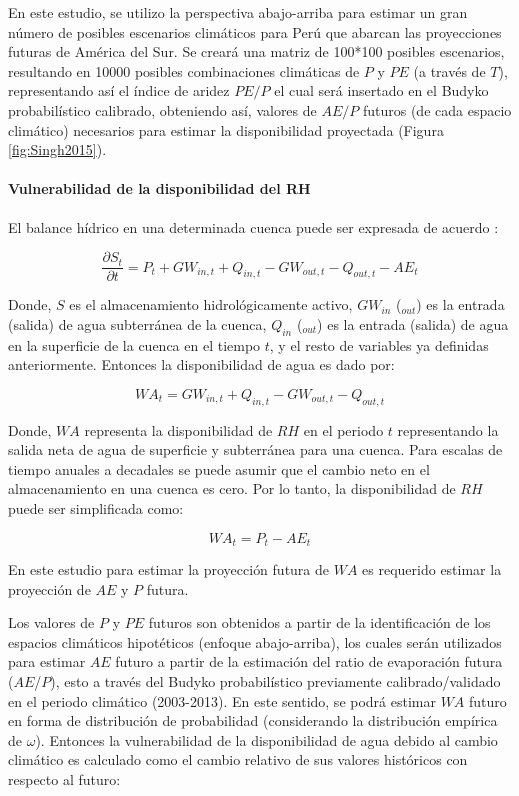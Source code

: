 \documentclass[12pt]{article}
\begin{document}
En este estudio, se utilizo la perspectiva abajo-arriba para estimar un gran número de posibles escenarios climáticos para Perú que abarcan las proyecciones futuras de América del Sur. Se creará una matriz de 100*100 posibles escenarios, resultando en 10000 posibles combinaciones climáticas de $P$ y $PE$ (a través de $T$), representando así el índice de aridez $PE/P$ el cual será insertado en el Budyko probabilístico calibrado, obteniendo así, valores de $AE/P$ futuros (de cada espacio climático) necesarios para estimar la disponibilidad proyectada (Figura \ref{fig:Singh2015}).

\paragraph{Vulnerabilidad de la disponibilidad del RH}\mbox{}

El balance hídrico en una determinada cuenca puede ser expresada de acuerdo \citep{Singh2015}:

\begin{equation}
\frac{\partial S_{t}}{\partial t} = P_{t} + GW_{in,t} + Q_{in,t} - GW_{out,t} - Q_{out,t} - AE_{t} 
\end{equation}

Donde, $S$ es el almacenamiento hidrológicamente activo, $GW_{in}$ ($_{out}$) es la entrada (salida) de agua subterránea de la cuenca, $Q_{in}$ ($_{out}$) es la entrada (salida) de agua en la superficie de la cuenca en el tiempo $t$, y el resto de variables ya definidas anteriormente. Entonces la disponibilidad de agua es dado por:

\begin{equation}
WA_{t} =  GW_{in,t} + Q_{in,t} - GW_{out,t} - Q_{out,t}
\end{equation}

Donde, $WA$ representa la disponibilidad de $RH$ en el periodo $t$ representando la salida neta de agua de superficie y subterránea para una cuenca. Para escalas de tiempo anuales a decadales se puede asumir que el cambio neto en el almacenamiento en una cuenca es cero. Por lo tanto, la disponibilidad de $RH$ puede ser simplificada como: 

\begin{equation}
WA_{t} = P_{t} - AE_{t}
\end{equation}

En este estudio para estimar la proyección futura de $WA$ es requerido estimar la proyección de $AE$ y $P$ futura.

Los valores de $P$ y $PE$ futuros son obtenidos a partir de la identificación de los espacios climáticos hipotéticos (enfoque abajo-arriba), los cuales serán utilizados para estimar $AE$ futuro a partir de la estimación del ratio de evaporación futura ($AE$/$P$), esto a través del Budyko probabilístico previamente calibrado/validado en el periodo climático (2003-2013). En este sentido, se podrá estimar $WA$ futuro en forma de distribución de probabilidad (considerando la distribución empírica de $\omega$). Entonces la vulnerabilidad de la disponibilidad de agua debido al cambio climático es calculado como el cambio relativo de sus valores históricos con respecto al futuro:
\end{document}
